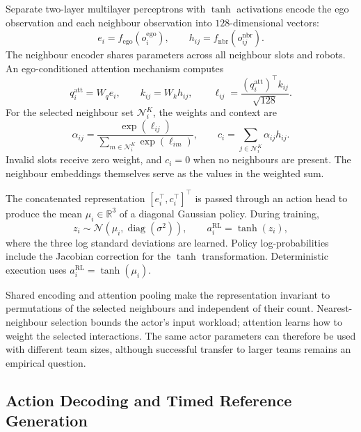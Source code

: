 Separate two-layer multilayer perceptrons with $\tanh$ activations encode the
ego observation and each neighbour observation into $128$-dimensional vectors:
\begin{equation}
    e_i=f_{\mathrm{ego}}(o_i^{\mathrm{ego}}),
    \qquad h_{ij}=f_{\mathrm{nbr}}(o_{ij}^{\mathrm{nbr}}).
\end{equation}
The neighbour encoder shares parameters across all neighbour slots and robots.
An ego-conditioned attention mechanism computes
\begin{equation}
    q_i^{\mathrm{att}}=W_qe_i,
    \qquad k_{ij}=W_kh_{ij},
    \qquad \ell_{ij}=\frac{(q_i^{\mathrm{att}})^\top k_{ij}}{\sqrt{128}}.
\end{equation}
For the selected neighbour set $\mathcal{N}_i^K$, the weights and context are
\begin{equation}
    \alpha_{ij}=
    \frac{\exp(\ell_{ij})}{\sum_{m\in\mathcal{N}_i^K}\exp(\ell_{im})},
    \qquad c_i=\sum_{j\in\mathcal{N}_i^K}\alpha_{ij}h_{ij}.
\end{equation}
Invalid slots receive zero weight, and $c_i=0$ when no neighbours are present.
The neighbour embeddings themselves serve as the values in the weighted sum.

The concatenated representation $[e_i^\top,c_i^\top]^\top$ is passed through
an action head to produce the mean $\mu_i\in\mathbb{R}^3$ of a diagonal
Gaussian policy. During training,
\begin{equation}
    z_i\sim\mathcal{N}(\mu_i,\operatorname{diag}(\sigma^2)),
    \qquad a_i^{\mathrm{RL}}=\tanh(z_i),
\end{equation}
where the three log standard deviations are learned. Policy log-probabilities
include the Jacobian correction for the $\tanh$ transformation. Deterministic
execution uses $a_i^{\mathrm{RL}}=\tanh(\mu_i)$.

Shared encoding and attention pooling make the representation invariant to
permutations of the selected neighbours and independent of their count.
Nearest-neighbour selection bounds the actor's input workload; attention
learns how to weight the selected interactions. The same actor parameters
can therefore be used with different team sizes, although successful transfer
to larger teams remains an empirical question.

\subsection{Action Decoding and Timed Reference Generation}

